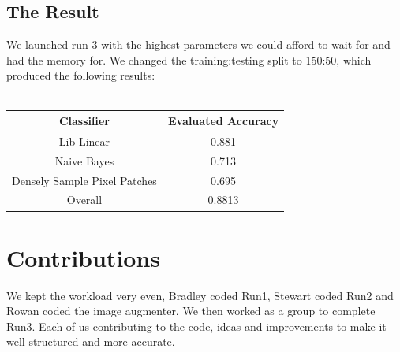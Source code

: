 \documentclass{article}
\begin{document}
	\subsection{The Result}
	We launched run 3 with the highest parameters we could afford to wait for and had the memory for. We changed the training:testing split to 150:50, which produced the following results:\\
	\\
	\begin{tabular}{|c|c|}
		\hline
		\textbf{Classifier} & \textbf{Evaluated Accuracy}\\ \hline
		Lib Linear & 0.881\\
		Naive Bayes & 0.713\\
		Densely Sample Pixel Patches & 0.695\\ \hline \hline
		Overall & 0.8813\\ \hline
	\end{tabular}
	
	\section{Contributions}
	We kept the workload very even, Bradley coded Run1, Stewart coded Run2 and Rowan coded the image augmenter. We then worked as a group to complete Run3. Each of us contributing to the code, ideas and improvements to make it well structured and more accurate.
	
	
\end{document}
